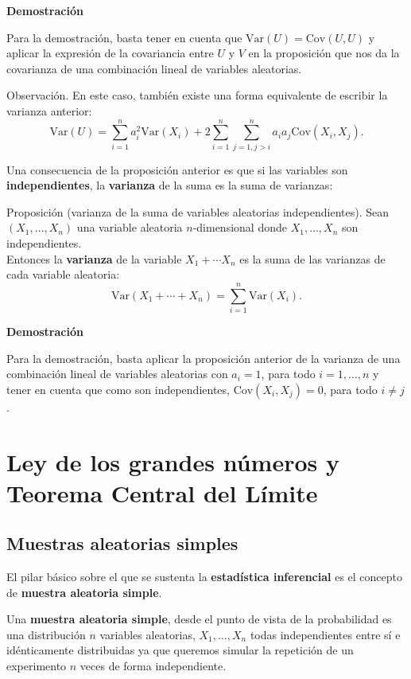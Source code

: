 \documentclass[]{book}
\begin{document}
\textbf{Demostración}

Para la demostración, basta tener en cuenta que \(\mathrm{Var}(U)=\mathrm{Cov}(U,U)\) y aplicar la expresión de la covariancia entre \(U\) y \(V\) en la proposición que nos da la covarianza de una combinación lineal de variables aleatorias.

Observación.
En este caso, también existe una forma equivalente de escribir la varianza anterior:
\[
\mathrm{Var}(U)=\sum_{i=1}^n a_i^2 \mathrm{Var}(X_i)+2\sum_{i=1}^n\sum_{j=1,j>i}^n a_i a_j \mathrm{Cov}(X_i,X_j).
\]

Una consecuencia de la proposición anterior es que si las variables son \textbf{independientes}, la \textbf{varianza} de la suma es la suma de varianzas:

Proposición (varianza de la suma de variables aleatorias independientes).
Sean \((X_1,\ldots,X_n)\) una variable aleatoria \(n\)-dimensional donde \(X_1,\ldots, X_n\) son independientes.\\
Entonces la \textbf{varianza} de la variable \(X_1+\cdots X_n\) es la suma de las varianzas de cada variable aleatoria:
\[
\mathrm{Var}(X_1+\cdots + X_n)=\sum_{i=1}^n \mathrm{Var}(X_i).
\]

\textbf{Demostración}

Para la demostración, basta aplicar la proposición anterior de la varianza de una combinación lineal de variables aleatorias con \(a_i=1\), para todo \(i=1,\ldots,n\) y tener en cuenta que como son independientes, \(\mathrm{Cov}(X_i,X_j)=0\), para todo \(i\neq j\).

\hypertarget{ley-de-los-grandes-nuxfameros-y-teorema-central-del-luxedmite}{%
\chapter{Ley de los grandes números y Teorema Central del Límite}\label{ley-de-los-grandes-nuxfameros-y-teorema-central-del-luxedmite}}

\hypertarget{muestras-aleatorias-simples}{%
\section{Muestras aleatorias simples}\label{muestras-aleatorias-simples}}

El pilar básico sobre el que se sustenta la \textbf{estadística inferencial} es el concepto de \textbf{muestra aleatoria simple}.

Una \textbf{muestra aleatoria simple}, desde el punto de vista de la probabilidad es una distribución \(n\) variables aleatorias, \(X_1,\ldots, X_n\) todas independientes entre sí e idénticamente distribuidas ya que queremos simular la repetición de un experimento \(n\) veces de forma independiente.
\end{document}
